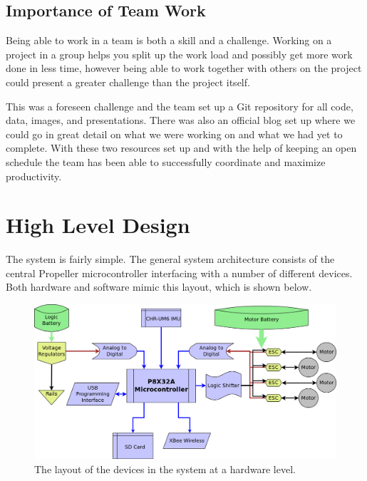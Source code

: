 \documentclass{article}
\numberwithin{equation}{section} %
\begin{document}
\subsection{Importance of Team Work}
Being able to work in a team is both a skill and a challenge. Working on a project in a group helps you split up the work load and possibly get more work done in less time, however being able to work together with others on the project could present a greater challenge than the project itself. 

This was a foreseen challenge and the team set up a Git repository for all code, data, images, and presentations. There was also an official blog set up where we could go in great detail on what we were working on and what we had yet to complete. With these two resources set up and with the help of keeping an open schedule the team has been able to successfully coordinate and maximize productivity.



\section{High Level Design}
The system is fairly simple. The general system architecture consists of the central Propeller microcontroller interfacing with a number of different devices. Both hardware and software mimic this layout, which is shown below.

\begin{figure}[h!]
  \centering
	\includegraphics[scale=.22]{system_architecture.png}
  \caption{The layout of the devices in the system at a hardware level.}
\end{figure}  
\end{document}
